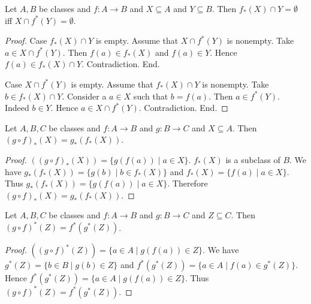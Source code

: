 \documentclass[10pt]{article}
\begin{document}
  \begin{forthel}
    \begin{proposition}[id=FOUNDATIONS_07_6295504988143616,printid]
      Let $A, B$ be classes and $f : A \to B$ and $X \subseteq A$ and $Y \subseteq B$.
      Then $f_{*}(X) \cap Y = \emptyset$ iff $X \cap f^{*}(Y) = \emptyset$.
    \end{proposition}
    \begin{proof}
      Case $f_{*}(X) \cap Y$ is empty.
        Assume that $X \cap f^{*}(Y)$ is nonempty.
        Take $a \in X \cap f^{*}(Y)$.
        Then $f(a) \in f_{*}(X)$ and $f(a) \in Y$.
        Hence $f(a) \in f_{*}(X) \cap Y$.
        Contradiction.
      End.

      Case $X \cap f^{*}(Y)$ is empty.
        Assume that $f_{*}(X) \cap Y$ is nonempty.
        Take $b \in f_{*}(X) \cap Y$.
        Consider a $a \in X$ such that $b = f(a)$.
        Then $a \in f^{*}(Y)$.
        Indeed $b \in Y$.
        Hence $a \in X \cap f^{*}(Y)$.
        Contradiction.
      End.
    \end{proof}
  \end{forthel}

  \begin{forthel}
    \begin{proposition}[id=FOUNDATIONS_07_5628919411638272,printid]
      Let $A, B, C$ be classes and $f : A \to B$ and $g : B \to C$ and $X \subseteq A$.
      Then $(g \circ f)_{*}(X) = g_{*}(f_{*}(X))$.
    \end{proposition}
    \begin{proof}
      $((g \circ f)_{*}(X)) = \{ g(f(a)) \mid a \in X \}$. %
      $f_{*}(X)$ is a subclass of $B$.
      We have $g_{*}(f_{*}(X)) = \{ g(b) \mid b \in f_{*}(X) \}$ and $f_{*}(X) = \{ f(a) \mid a \in X \}$.
      Thus $g_{*}(f_{*}(X)) = \{ g(f(a)) \mid a \in X \}$.
      Therefore $(g \circ f)_{*}(X) = g_{*}(f_{*}(X))$.
    \end{proof}
  \end{forthel}

  \begin{forthel}
    \begin{proposition}[id=FOUNDATIONS_07_6824917886566400,printid]
      Let $A, B, C$ be classes and $f : A \to B$ and $g : B \to C$ and $Z \subseteq C$.
      Then $(g \circ f)^{*}(Z) = f^{*}(g^{*}(Z))$.
    \end{proposition}
    \begin{proof}
      $((g \circ f)^{*}(Z)) = \{ a \in A \mid g(f(a)) \in Z \}$.
      We have $g^{*}(Z) = \{ b \in B \mid g(b) \in Z \}$ and $f^{*}(g^{*}(Z)) = \{ a \in A \mid f(a) \in g^{*}(Z) \}$.
      Hence $f^{*}(g^{*}(Z)) = \{ a \in A \mid g(f(a)) \in Z \}$.
      Thus $(g \circ f)^{*}(Z) = f^{*}(g^{*}(Z))$.
    \end{proof}
  \end{forthel}
\end{document}
